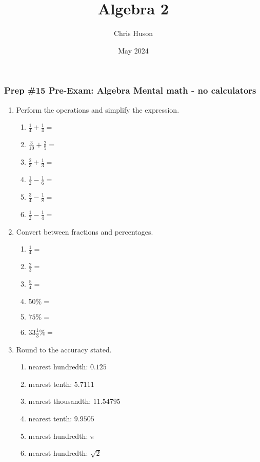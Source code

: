 \documentclass[12pt, twoside]{article}
\title{Algebra 2}
\author{Chris Huson}
\date{May 2024}
\begin{document}
\subsubsection*{Prep \#15 Pre-Exam: Algebra \hfill Mental math - no calculators}
\begin{enumerate}[itemsep=0.5cm]

\item Perform the operations and simplify the expression.
    \begin{multicols}{2}
    \begin{enumerate}[itemsep=0.5cm]
        \item $\displaystyle \frac{1}{4} + \frac{1}{4} =$
        \item $\displaystyle \frac{3}{10} + \frac{2}{5} =$
        \item $\displaystyle \frac{2}{3} + \frac{1}{3} =$
        \item $\displaystyle \frac{1}{2} - \frac{1}{6} =$
        \item $\displaystyle \frac{3}{4} - \frac{1}{8} =$
        \item $\displaystyle \frac{1}{2} - \frac{1}{4} =$

    \end{enumerate}
    \end{multicols}

\item Convert between fractions and percentages.
    \begin{multicols}{2}
    \begin{enumerate}[itemsep=0.5cm]
        \item $\frac{1}{4}=$
        \item $\frac{2}{3}=$
        \item $\frac{5}{4}=$
        \item $50\% =$
        \item $75\% =$
        \item $33 \frac{1}{3}\% =$
    \end{enumerate}
    \end{multicols}

\item Round to the accuracy stated.
    \begin{multicols}{2}
    \begin{enumerate}[itemsep=0.75cm]
        \item nearest hundredth: $0.125$
        \item nearest tenth: $5.7111$
        \item nearest thousandth: $11.54795$
        \item nearest tenth: $9.9505$
        \item nearest hundredth: $\pi$
        \item nearest hundredth: $\sqrt{2}$
    \end{enumerate}
    \end{multicols} \vspace{0.5cm}


\end{enumerate}
\end{document}
